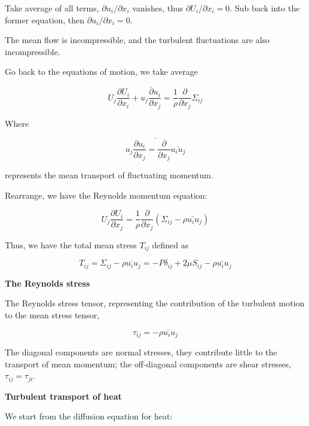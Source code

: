 \documentclass{article}
\begin{document}
Take average of all terms, ${\partial u_i}/{\partial x_i}$ vanishes, thus $\partial U_i/\partial x_i=0$. Sub back into the former equation, then $\partial u_i/\partial x_i=0$.

The mean flow is incompressible, and the turbulent fluctuations are also incompressible.

Go back to the equations of motion, we take average

\begin{equation*}
    U_j\frac{\partial U_i}{\partial x_i}+\bar{u_j\frac{\partial u_i}{\partial x_j}}=\frac{1}{\rho}\frac{\partial}{\partial x_j}\Sigma_{ij}
\end{equation*}

Where

\begin{equation*}
    \bar{u_j\frac{\partial u_i}{\partial x_j}=\frac{\partial}{\partial x_j}\bar{u_iu_j}}
\end{equation*}

represents the mean transport of fluctuating momentum.

Rearrange, we have the Reynolds momentum equation:

\begin{equation*}
    U_j\frac{\partial U_i}{\partial x_j}=\frac{1}{\rho}\frac{\partial}{\partial x_j}\left(\Sigma_{ij}-\bar{\rho u_iu_j}\right)
\end{equation*}

Thus, we have the total mean stress $T_{ij}$ defined as

\begin{equation*}
    T_{ij}=\Sigma_{ij}-\bar{\rho u_iu_j}=-P\delta_{ij}+2\mu S_{ij}-\bar{\rho u_iu_j}
\end{equation*}

\textbf{The Reynolds stress}

The Reynolds stress tensor, representing the contribution of the turbulent motion to the mean stress tensor,

\begin{equation*}
    \tau_{ij}=-\bar{\rho u_iu_j}
\end{equation*}

The diagonal components are normal stresses, they contribute little to the transport of mean momentum; the off-diagonal components are shear stresses, $\tau_{ij}=\tau_{ji}$.

\textbf{Turbulent transport of heat}

We start from the diffusion equation for heat:
\end{document}
